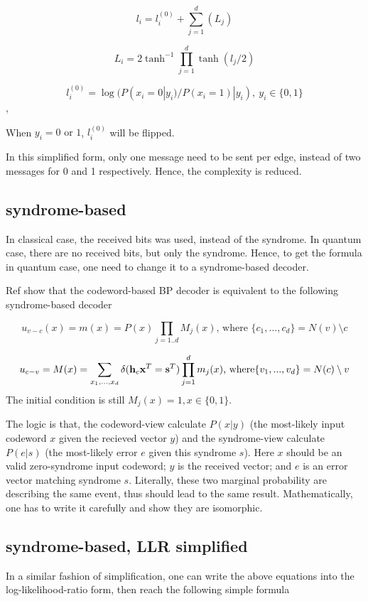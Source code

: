 \documentclass[aps,prb,12pt,tightenlines,%
notitlepage,longbibliography
]{revtex4-1}
\begin{document}
$$l_i=l_i^{(0)}+\sum_{j=1}^d (L_j)$$

$$L_i = 2 \tanh^{-1} \prod_{j=1}^d \tanh (l_j/2)$$

$$l^{(0)}_i=\log (P(x_i=0|y_i)/P(x_i=1)|y_i),~ y_i \in \{0,1\}$$,

When $y_i= 0 \text{ or } 1$, $l_i^{(0)}$ will be flipped.

In this simplified form, only one message need to be sent per edge,
instead of two messages for 0 and 1 respectively. Hence, the
complexity is reduced.

\subsection{syndrome-based}
In classical case, the received bits was used, instead of the
syndrome. In quantum case, there are no received bits, but only the
syndrome.
Hence, to get the formula in quantum case, one need to
change it to a syndrome-based decoder.

Ref \cite[chapter~47.2]{mackay2003information} show that the
codeword-based BP decoder is equivalent to the following
syndrome-based decoder

$$u_{v-c}(x) =m(x) = P(x) \prod_{j=1..d}  M_j(x)  \text {, where }
\{c_1,...,c_d \} = N(v)\setminus c$$

$$u_{c-v} = M(x) = \sum_{x_1,...,x_d} \delta( {\bf h}_c {\bf x}^T={\bf
s}^T)
\prod_{j=1}^d m_j(x) \text{, where} \{ v_1,...,v_d \} = N(c)
\setminus v$$
The initial condition is still $M_j(x)=1, x \in \{0,1\}$.

The logic is that, the codeword-view calculate $P(x|y)$ (the
most-likely input codeword $x$ given the recieved vector $y$) and the
syndrome-view calculate $P(e|s)$ (the most-likely error $e$ given this
syndrome $s$). Here $x$ should be an valid zero-syndrome
input codeword; $y$ is the received vector; and $e$ is an error vector
matching syndrome $s$. Literally, these two marginal probability are
describing the same event, thus should lead to the same
result. Mathematically, one has to write it carefully and show they
are isomorphic.

\subsection{syndrome-based, LLR simplified}
In a similar fashion of simplification, one can write the above
equations into the log-likelihood-ratio form, then reach the following
simple formula \cite{liu2018neural}
\end{document}
